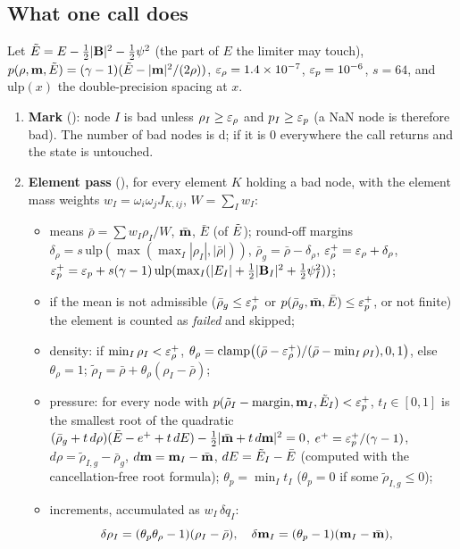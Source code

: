 \subsection*{What one call does}
Let $\tilde E=E-\tfrac12|\mathbf{B}|^2-\tfrac12\psi^2$ (the part of $E$ the limiter may touch),
$p(\rho,\mathbf{m},\tilde E)=(\gamma-1)(\tilde E-|\mathbf{m}|^2/(2\rho))$, $\varepsilon_\rho=1.4\times10^{-7}$, $\varepsilon_p=10^{-6}$, $s=64$, and
$\mathrm{ulp}(x)$ the double-precision spacing at $x$.
\begin{enumerate}[leftmargin=*]
\item \textbf{Mark} (): node $I$ is bad unless $\rho_I\ge\varepsilon_\rho$ and $p_I\ge\varepsilon_p$
(a NaN node is therefore bad). The number of bad nodes is d; if it is 0 everywhere the
call returns and the state is untouched.
\item \textbf{Element pass} (), for every element $K$ holding a bad node, with the
element mass weights $w_I=\omega_i\omega_jJ_{K,ij}$, $W=\sum_Iw_I$:
\begin{itemize}
\item means $\bar\rho=\sum w_I\rho_I/W$, $\bar{\mathbf{m}}$, $\bar E$ (of $\tilde E$); round-off margins
$\delta_\rho=s\,\mathrm{ulp}(\max(\max_I|\rho_I|,|\bar\rho|))$, $\bar\rho_g=\bar\rho-\delta_\rho$,
$\varepsilon_\rho^+=\varepsilon_\rho+\delta_\rho$, $\varepsilon_p^+=\varepsilon_p+s(\gamma-1)\,\mathrm{ulp}(\max_I(|E_I|+\tfrac12|\mathbf{B}_I|^2+\tfrac12\psi_I^2))$;
\item if the mean is not admissible ($\bar\rho_g\le\varepsilon_\rho^+$ or $p(\bar\rho_g,\bar{\mathbf{m}},\bar E)\le\varepsilon_p^+$, or not
finite) the element is counted as \emph{failed} and skipped;
\item density: if $\min_I\rho_I<\varepsilon_\rho^+$, $\theta_\rho=\mathrm{clamp}\big((\bar\rho-\varepsilon_\rho^+)/(\bar\rho-\min_I\rho_I),0,1\big)$,
else $\theta_\rho=1$; $\tilde\rho_I=\bar\rho+\theta_\rho(\rho_I-\bar\rho)$;
\item pressure: for every node with $p(\tilde\rho_I-\text{margin},\mathbf{m}_I,\tilde E_I)<\varepsilon_p^+$, $t_I\in[0,1]$ is the
smallest root of the quadratic $(\bar\rho_g+t\,d\rho)(\bar E-e^++t\,dE)-\tfrac12|\bar{\mathbf{m}}+t\,d\mathbf{m}|^2=0$,
$e^+=\varepsilon_p^+/(\gamma-1)$, $d\rho=\tilde\rho_{I,g}-\bar\rho_g$, $d\mathbf{m}=\mathbf{m}_I-\bar{\mathbf{m}}$, $dE=\tilde E_I-\bar E$
(computed with the cancellation-free root formula); $\theta_p=\min_It_I$ ($\theta_p=0$ if some $\tilde\rho_{I,g}\le0$);
\item increments, accumulated as $w_I\,\delta q_I$:
\[
\delta\rho_I=(\theta_p\theta_\rho-1)(\rho_I-\bar\rho),\quad
\delta\mathbf{m}_I=(\theta_p-1)(\mathbf{m}_I-\bar{\mathbf{m}}),\quad
\]
\end{itemize}
\end{enumerate}
